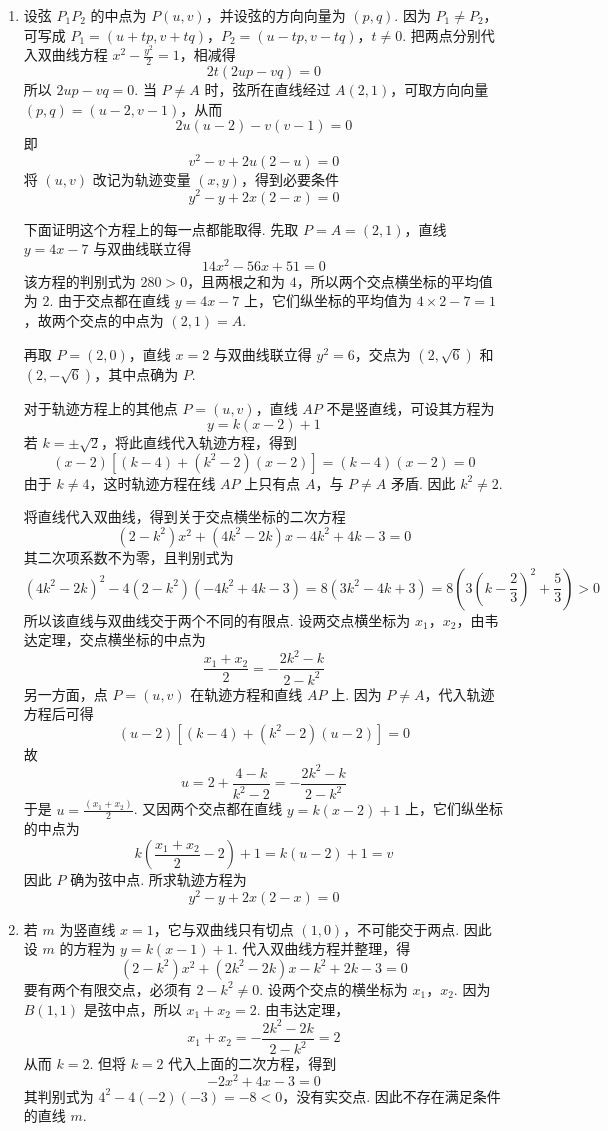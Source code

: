 \begin{solution}
\begin{enumerate}
\item 设弦 \(P_1P_2\) 的中点为 \(P(u,v)\)，并设弦的方向向量为 \((p,q)\). 因为 \(P_1\ne P_2\)，可写成
\(P_1=(u+tp,v+tq)\)，\(P_2=(u-tp,v-tq)\)，\(t\ne0\).
把两点分别代入双曲线方程 \(x^2-\frac{y^2}{2}=1\)，相减得
\[
2t\left(2up-vq\right)=0
\]
所以 \(2up-vq=0\). 当 \(P\ne A\) 时，弦所在直线经过 \(A(2,1)\)，可取方向向量 \((p,q)=(u-2,v-1)\)，从而
\[
2u(u-2)-v(v-1)=0
\]
即
\[
v^2-v+2u(2-u)=0
\]
将 \((u,v)\) 改记为轨迹变量 \((x,y)\)，得到必要条件
\[
y^2-y+2x(2-x)=0
\]

下面证明这个方程上的每一点都能取得. 先取 \(P=A=(2,1)\)，直线 \(y=4x-7\) 与双曲线联立得
\[
14x^2-56x+51=0
\]
该方程的判别式为 \(280>0\)，且两根之和为 \(4\)，所以两个交点横坐标的平均值为 \(2\). 由于交点都在直线 \(y=4x-7\) 上，它们纵坐标的平均值为 \(4\times2-7=1\)，故两个交点的中点为 \((2,1)=A\).

再取 \(P=(2,0)\)，直线 \(x=2\) 与双曲线联立得 \(y^2=6\)，交点为 \((2,\sqrt6)\) 和 \((2,-\sqrt6)\)，其中点确为 \(P\).

对于轨迹方程上的其他点 \(P=(u,v)\)，直线 \(AP\) 不是竖直线，可设其方程为
\[
y=k(x-2)+1
\]
若 \(k=\pm\sqrt2\)，将此直线代入轨迹方程，得到
\[
(x-2)\left[(k-4)+(k^2-2)(x-2)\right]=(k-4)(x-2)=0
\]
由于 \(k\ne4\)，这时轨迹方程在线 \(AP\) 上只有点 \(A\)，与 \(P\ne A\) 矛盾. 因此 \(k^2\ne2\).

将直线代入双曲线，得到关于交点横坐标的二次方程
\[
(2-k^2)x^2+(4k^2-2k)x-4k^2+4k-3=0
\]
其二次项系数不为零，且判别式为
\[
(4k^2-2k)^2-4(2-k^2)(-4k^2+4k-3)
=8(3k^2-4k+3)=8\left(3\left(k-\frac23\right)^2+\frac53\right)>0
\]
所以该直线与双曲线交于两个不同的有限点. 设两交点横坐标为 \(x_1\)，\(x_2\)，由韦达定理，交点横坐标的中点为
\[
\frac{x_1+x_2}{2}=-\frac{2k^2-k}{2-k^2}
\]
另一方面，点 \(P=(u,v)\) 在轨迹方程和直线 \(AP\) 上. 因为 \(P\ne A\)，代入轨迹方程后可得
\[
(u-2)\left[(k-4)+(k^2-2)(u-2)\right]=0
\]
故
\[
u=2+\frac{4-k}{k^2-2}=-\frac{2k^2-k}{2-k^2}
\]
于是 \(u=\frac{(x_1+x_2)}{2}\). 又因两个交点都在直线 \(y=k(x-2)+1\) 上，它们纵坐标的中点为
\[
k\left(\frac{x_1+x_2}{2}-2\right)+1=k(u-2)+1=v
\]
因此 \(P\) 确为弦中点. 所求轨迹方程为
\[
y^2-y+2x(2-x)=0
\]
\item 若 \(m\) 为竖直线 \(x=1\)，它与双曲线只有切点 \((1,0)\)，不可能交于两点. 因此设 \(m\) 的方程为 \(y=k(x-1)+1\). 代入双曲线方程并整理，得
\[
(2-k^2)x^2+(2k^2-2k)x-k^2+2k-3=0
\]
要有两个有限交点，必须有 \(2-k^2\ne0\). 设两个交点的横坐标为 \(x_1\)，\(x_2\). 因为 \(B(1,1)\) 是弦中点，所以 \(x_1+x_2=2\). 由韦达定理，
\[
x_1+x_2=-\frac{2k^2-2k}{2-k^2}=2
\]
从而 \(k=2\). 但将 \(k=2\) 代入上面的二次方程，得到
\[
-2x^2+4x-3=0
\]
其判别式为 \(4^2-4(-2)(-3)=-8<0\)，没有实交点. 因此不存在满足条件的直线 \(m\).
\end{enumerate}
\end{solution}


